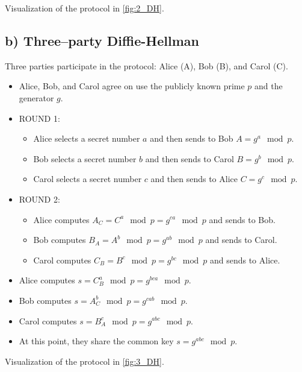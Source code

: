 Visualization of the protocol in \autoref{fig:2_DH}.

\subsection*{b) Three--party Diffie-Hellman}
%
Three parties participate in the protocol: Alice (A), Bob (B), and Carol (C).
\begin{itemize}
    \item Alice, Bob, and Carol agree on use the publicly known prime \(p\) and
    the generator \(g\).
    \item ROUND 1:
    \begin{itemize}
        \item Alice selects a secret number \(a\) and then sends to Bob \(A=g^a \mod p\).
        \item Bob selects a secret number \(b\) and then sends to Carol \(B=g^b \mod p\).
        \item Carol selects a secret number \(c\) and then sends to Alice \(C=g^c \mod p\).
    \end{itemize}
    \item ROUND 2:
    \begin{itemize}
        \item Alice computes \(A_C=C^a \mod p=g^{ca} \mod p\) and sends to Bob.
        \item Bob computes \(B_A=A^b \mod p=g^{ab} \mod p\) and sends to Carol.
        \item Carol computes \(C_B=B^c \mod p=g^{bc} \mod p\) and sends to Alice.
    \end{itemize}
    \item Alice computes \(s=C_B^a \mod p=g^{bca} \mod p\).
    \item Bob computes \(s=A_C^b \mod p=g^{cab} \mod p\).
    \item Carol computes \(s=B_A^c \mod p=g^{abc} \mod p\).
    \item At this point, they share the common key \(s=g^{abc} \mod p\).
\end{itemize}

Visualization of the protocol in \autoref{fig:3_DH}.


